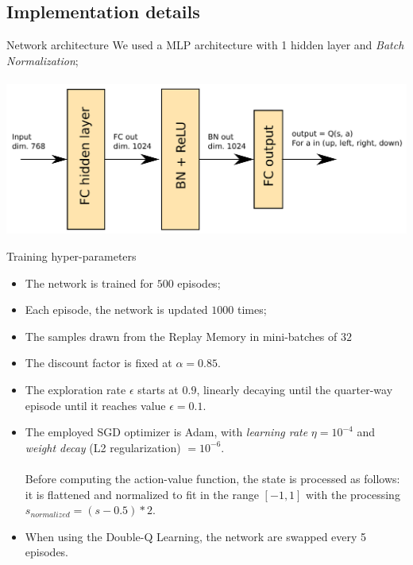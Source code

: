 \documentclass{beamer}
\begin{document}
\subsection{Implementation details}
\begin{frame}{Network architecture}
	We used a MLP architecture with 1 hidden layer and \textit{Batch Normalization}; \\~\\
	\includegraphics[width=\textwidth]{network}
\end{frame}
\begin{frame}{Training hyper-parameters}
	\begin{itemize}
	\item The network is trained for $500$ episodes;
	\item Each episode, the network is updated $1000$ times;
	\item The samples drawn from the Replay Memory in mini-batches of $32$
	\item The discount factor is fixed at $\alpha=0.85$. 
	\item The exploration rate $\epsilon$ starts at $0.9$, linearly decaying until the quarter-way episode until it reaches value $\epsilon = 0.1$. 
	\item The employed SGD optimizer is Adam, with \textit{learning rate} $\eta = 10^{-4}$ and \textit{weight decay} (L2 regularization) $= 10^{-6}$.
	\\~\\
Before computing the action-value function, the state is processed as follows: it is flattened and normalized to fit in the range $[-1,1]$ with the processing $s_{normalized} = (s - 0.5)*2$. 
	
	\item When using the Double-Q Learning, the network are swapped every 5 episodes.
	\end{itemize}

\end{frame}
\end{document}
